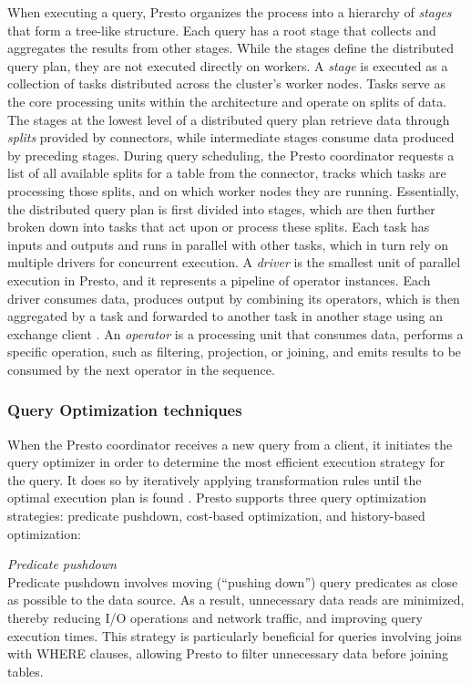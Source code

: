 \documentclass[conference]{IEEEtran}
\begin{document}
When executing a query, Presto organizes the process into a hierarchy of \textit{stages} that form a tree-like structure. Each query has a root stage that collects and aggregates the results from other stages. While the stages define the distributed query plan, they are not executed directly on workers.
A \textit{stage} is executed as a collection of tasks distributed across the cluster’s worker nodes. Tasks serve as the core processing units within the architecture and operate on splits of data. The stages at the lowest level of a distributed query plan retrieve data through \textit{splits} provided by connectors, while intermediate stages consume data produced by preceding stages. During query scheduling, the Presto coordinator requests a list of all available splits for a table from the connector, tracks which tasks are processing those splits, and on which worker nodes they are running.
Essentially, the distributed query plan is first divided into stages, which are then further broken down into tasks that act upon or process these splits.  Each task has inputs and outputs and runs in parallel with other tasks, which in turn rely on multiple drivers for concurrent execution.
A \textit{driver} is the smallest unit of parallel execution in Presto, and it represents a pipeline of operator instances. Each driver consumes data, produces output by combining its operators, which is then aggregated by a task and forwarded to another task in another stage using an exchange client \cite{b3}.
An \textit{operator} is a processing unit that consumes data, performs a specific operation, such as filtering, projection, or joining, and emits results to be consumed by the next operator in the sequence.


\subsubsection{Query Optimization techniques}

When the Presto coordinator receives a new query from a client, it initiates the query optimizer in order to determine the most efficient execution strategy for the query. It does so by iteratively applying transformation rules until the optimal execution plan is found \cite{b4,b7}. Presto supports three query optimization strategies: predicate pushdown, cost-based optimization, and history-based optimization:

\textit{Predicate pushdown} \\
Predicate pushdown involves moving (``pushing down'') query predicates as close as possible to the data source. As a result, unnecessary data reads are minimized, thereby reducing I/O operations and network traffic, and improving query execution times. This strategy is particularly beneficial for queries involving joins with WHERE clauses, allowing Presto to filter unnecessary data before joining tables.\cite{b7}
\end{document}
